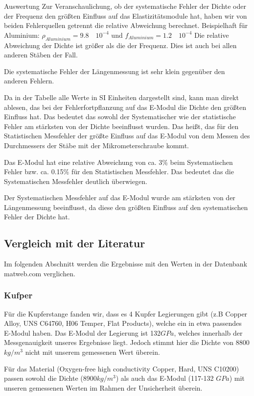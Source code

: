 \documentclass[twoside]{protokoll}
\begin{document}
\begin{aufgabe}{Auswertung}
Zur Veranschaulichung, ob der systematische Fehler der Dichte oder der Frequenz den größten Einfluss auf das Elastizitätsmodule hat, haben wir von beiden Fehlerquellen getrennt die relative Abweichung berechnet.
Beispielhaft für Aluminium:
$ \rho_{Aluminium} = 9.8 \quad 10^{-4} $ und $ f_{Aluminium} = 1.2 \quad 10^{-4} $
Die relative Abweichung der Dichte ist größer als die der Frequenz. Dies ist auch bei allen anderen Stäben der Fall.

Die systematische Fehler der Längenmessung ist sehr klein gegenüber den anderen Fehlern.

Da in der Tabelle alle Werte in SI Einheiten dargestellt sind, kann man direkt ablesen,
das bei der Fehlerfortpflanzung auf das E-Modul die Dichte den größten Einfluss hat. 
Das bedeutet das sowohl der Systematischer wie der statistische Fehler am stärksten von der Dichte beeinflusst wurden.
Das heißt, das für den Statistischen Messfehler der größte Einfluss auf das E-Modul von dem Messen des Durchmessers der Stäbe mit der Mikrometerschraube kommt.
 
Das E-Modul hat eine relative Abweichung von ca. 3\% beim Systematischen Fehler bzw. ca. 0.15\% für den Statistischen Messfehler.
Das bedeutet das die Systematischen Messfehler deutlich überwiegen.
 
Der Systematischen Messfehler auf das E-Modul wurde am stärksten von der Längenmessung beeinflusst, da diese den größten Einfluss auf den systematischen Fehler der Dichte hat. \\
\subsection{Vergleich mit der Literatur} 

Im folgenden Abschnitt werden die Ergebnisse mit den Werten in der Datenbank matweb.com verglichen.
\subsubsection{Kufper} 
Für die Kupferstange fanden wir, dass es 4 Kupfer Legierungen gibt (z.B Copper Alloy, UNS C64760, H06 Temper, Flat Products), welche ein in etwa passendes E-Modul haben.
Das E-Modul der Legierung ist 132$GPa$, welches innerhalb der Messgenauigkeit unseres Ergebnisse liegt.
Jedoch stimmt hier die Dichte von 8800$kg/m^3$ nicht mit unserem gemessenen Wert überein.
 
Für das Material (Oxygen-free high conductivity Copper, Hard, UNS C10200) passen sowohl die Dichte (8900$kg/m^3$) als auch das E-Modul (117-132 $GPa$) mit unseren gemessenen Werten im Rahmen der Unsicherheit überein. \\
 

\end{aufgabe}
\end{document}
